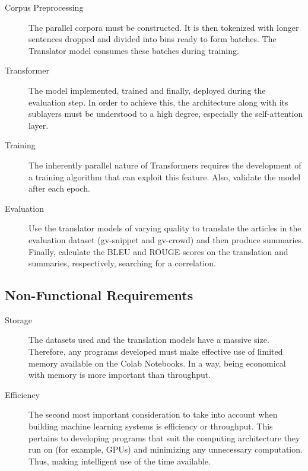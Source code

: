 \documentclass[12pt,a4paper,twoside,openright]{report}
\begin{document}
\begin{description}
    

\item[Corpus Preprocessing] The parallel corpora must be constructed. It is then tokenized with longer sentences dropped and divided into bins ready to form batches. The Translator model consumes these batches during training. 

\item[Transformer] The model implemented, trained and finally, deployed during the evaluation step. In order to achieve this, the architecture along with its sublayers must be understood to a high degree, especially the self-attention layer.  

\item[Training] The inherently parallel nature of Transformers requires the development of a training algorithm that can exploit this feature. Also, validate the model after each epoch. 

\item[Evaluation] Use the translator models of varying quality to translate the articles in the evaluation dataset (gv-snippet and gv-crowd) and then produce summaries. Finally, calculate the BLEU and ROUGE scores on the translation and summaries, respectively, searching for a correlation.  

\end{description}

\subsection{Non-Functional Requirements}
\label{non-functional-requirements}

\begin{description}
\item[Storage]
The datasets used and the translation models have a massive size. Therefore, any programs developed must make effective use of limited memory available on the Colab Notebooks. In a way, being economical with memory is more important than throughput.

\item[Efficiency]
The second most important consideration to take into account when building machine learning systems is efficiency or throughput. This pertains to developing programs that suit the computing architecture they run on (for example, GPUs) and minimizing any unnecessary computation. Thus, making intelligent use of the time available. 
\end{description}
\end{document}
